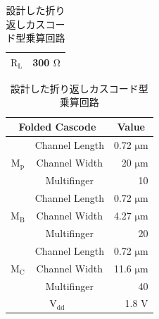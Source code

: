 \begin{table}[!b]
\begin{minipage}[t]{.45\textwidth}
\begin{center}
\begin{tabular}{c|c|r}
                        \multicolumn{2}{c|}{$\mathrm{R_{L}}$} &   300 $\mathrm{\Omega}$   \\
                        \hline
                    \end{tabular}
                \end{center}                
            \end{minipage}
            \hfill
            \begin{minipage}[t]{.45\textwidth}
                \begin{center}
                    \caption{設計した折り返しカスコード型乗算回路}
                    \label{table:3_folded_gilbert_param}
                    \begin{tabular}{c|c|r}
                            \hline
                            \multicolumn{2}{c}{Folded Cascode}   & \multicolumn{1}{c}{Value}     \\
                            \hline\hline
                            &   Channel Length   &   0.72 $\mathrm{\mu m}$   \\
                            \cline{2-3}
                            $\mathrm{M_{p}}$   &   Channel Width   &   20 $\mathrm{\mu m}$   \\
                            \cline{2-3}
                                &   Multifinger   & 10    \\
                            \hline
                            &   Channel Length   &   0.72 $\mathrm{\mu m}$   \\
                            \cline{2-3}
                            $\mathrm{M_{B}}$   &   Channel Width   &   4.27 $\mathrm{\mu m}$   \\
                            \cline{2-3}
                                &   Multifinger   & 20    \\
                            \hline
                            &   Channel Length   &   0.72 $\mathrm{\mu m}$   \\
                            \cline{2-3}
                            $\mathrm{M_{C}}$   &   Channel Width   &   11.6 $\mathrm{\mu m}$   \\
                            \cline{2-3}
                                &   Multifinger   & 40    \\
                            \hline
                            \multicolumn{2}{c|}{$\mathrm{V_{dd}}$} &   1.8 $\mathrm{V}$   \\
                            \hline

\end{tabular}
\end{center}
\end{minipage}
\end{table}

